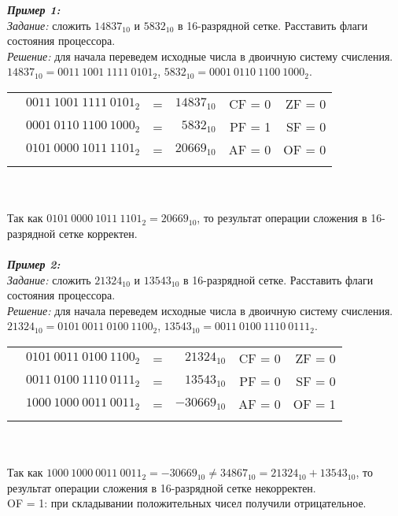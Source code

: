 \emph{\textbf{Пример 1:}}
\\\emph{Задание:} сложить $14837_{10}$ и $5832_{10}$ в 16-разрядной сетке. Расставить флаги состояния процессора.
\\\emph{Решение:} для начала переведем исходные числа в двоичную систему счисления. $14837_{10} = 0011\ 1001\ 1111\ 0101_{2}$, $5832_{10} = 0001\ 0110\ 1100\ 1000_{2}$.
\\
\begin{minipage}[c]{10cm}
\begin{tabular}{r l c r | r r |}
\\
\hhline{~~~~--}
\multirow{2}{*}{+} & $0011\ 1001\ 1111\ 0101_{2}$ & = & $14837_{10}$ & CF = 0 & ZF = 0
\\ & $0001\ 0110\ 1100\ 1000_{2}$ & = & $5832_{10}$ &  PF = 1 & SF = 0
\\ \hhline{~-~~~}
 & $0101\ 0000\ 1011\ 1101_{2}$ & = & $20669_{10}$ & AF = 0 & OF = 0
\\\hhline{~~~~--}
\end{tabular}
\end{minipage}
\\
\\Так как $0101\ 0000\ 1011\ 1101_{2} = 20669_{10}$, то результат операции сложения в 16-разрядной сетке корректен.
\\
\\\emph{\textbf{Пример 2:}}
\\\emph{Задание:} сложить $21324_{10}$ и $13543_{10}$ в 16-разрядной сетке. Расставить флаги состояния процессора.
\\\emph{Решение:} для начала переведем исходные числа в двоичную систему счисления. $21324_{10} = 0101\ 0011\ 0100\ 1100_{2}$, $13543_{10} = 0011\ 0100\ 1110\ 0111_{2}$.
\\
\begin{minipage}[c]{10cm}
\begin{tabular}{r l c r | r r |}
\\
\hhline{~~~~--}
\multirow{2}{*}{+} & $0101\ 0011\ 0100\ 1100_{2}$ & = & $21324_{10}$ & CF = 0 & ZF = 0
\\ & $0011\ 0100\ 1110\ 0111_{2}$ & = & $13543_{10}$ &  PF = 0 & SF = 0
\\ \hhline{~-~~~}
 & $1000\ 1000\ 0011\ 0011_{2}$ & = & $-30669_{10}$ & AF = 0 & OF = 1
\\\hhline{~~~~--}
\end{tabular}
\end{minipage}
\\
\\Так как $1000\ 1000\ 0011\ 0011_{2} = -30669_{10} \ne 34867_{10} = 21324_{10} + 13543_{10}$, то результат операции сложения в 16-разрядной сетке некорректен. \\OF = 1: при складывании положительных чисел получили отрицательное.
